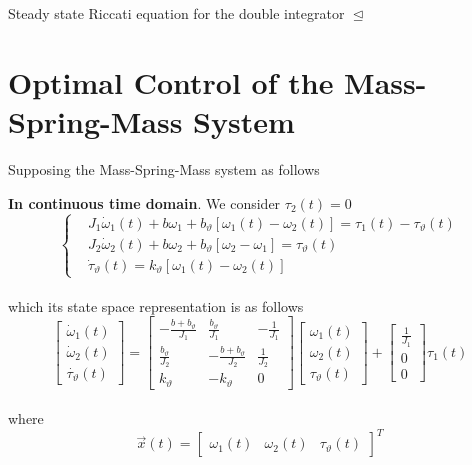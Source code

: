 \documentclass[12pt,a4paper,oneside]{book}
\begin{document}
\begin{onehalfspace}
\begin{example}{Steady state Riccati equation for the double integrator}
$\trianglelefteq$
\end{example}



\section{Optimal Control of the Mass-Spring-Mass System}
Supposing the Mass-Spring-Mass system as follows
\begin{mybox}
	\textbf{In continuous time domain}. We consider $\tau_2(t)=0$
	\begin{equation*}\label{two_mass_1}
		\left\lbrace 
		\begin{aligned}
			& J_1 \dot{\omega}_1(t) + b\omega_1+b_{\vartheta}\left[ 
			\omega_1(t)-\omega_2(t)\right] = \tau_1(t) - \tau_{\vartheta}(t) 
			\\[6pt]
			& J_2 \dot{\omega}_2(t) + b\omega_2+b_{\vartheta}\left[ 
			\omega_2-\omega_1\right] = \tau_{\vartheta}(t) \\[6pt]
			& \dot{\tau}_{\vartheta}(t) = k_{\vartheta}\left[  
			\omega_1(t)-\omega_2(t)\right]  
		\end{aligned}
		\right. 
	\end{equation*}\\
	which its state space representation is as follows
	\begin{equation*}\label{two_mass_2}
		\begin{bmatrix}
			\dot{\omega}_1(t) \\[6pt]
			\dot{\omega}_2(t) \\[6pt]
			\dot{\tau_{\vartheta}}(t)
		\end{bmatrix} = 
		\begin{bmatrix}
			-\frac{b+b_{\vartheta}}{J_1} & \frac{b_{\vartheta}}{J_1} & 
			-\frac{1}{J_1}\\[6pt]
			\frac{b_{\vartheta}}{J_2} & -\frac{b+b_{\vartheta}}{J_2} & 
			\frac{1}{J_2}\\[6pt]
			k_{\vartheta} & -k_{\vartheta} & 0
		\end{bmatrix}
		\begin{bmatrix}
			{\omega_1}(t) \\[6pt]
			{\omega_2}(t) \\[6pt]
			{\tau_{\vartheta}}(t)
		\end{bmatrix} + 
		\begin{bmatrix}
			\frac{1}{J_1} \\[6pt]
			0 \\[6pt]
			0
		\end{bmatrix} \tau_1(t)
	\end{equation*}\\
	where 
	\begin{equation*}
		\vec{x}(t) = \left[\begin{matrix} 
			\omega_1(t)&\omega_2(t)&\tau_{\vartheta}(t) \end{matrix} \right]^T
	\end{equation*}
	

\end{mybox}
\end{onehalfspace}
\end{document}
